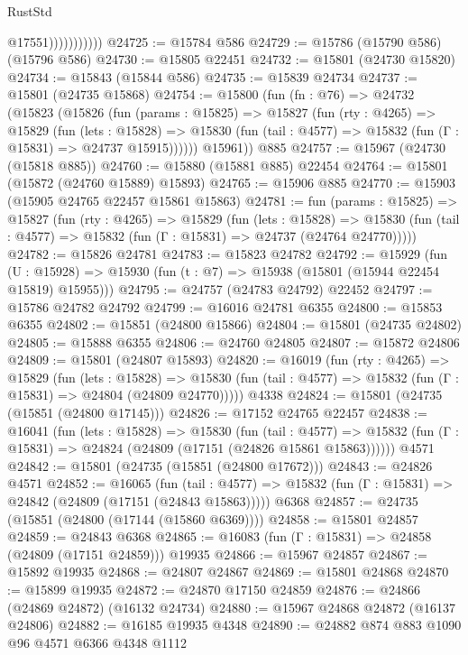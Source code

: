 \begin{lexlean}{RustStd}
\begin{coremodule}
                          @17551)))))))))))
@24725 := @15784 @586
@24729 := @15786 (@15790 @586) (@15796 @586)
@24730 := @15805 @22451
@24732 := @15801 (@24730 @15820)
@24734 := @15843 (@15844 @586)
@24735 := @15839 @24734
@24737 := @15801 (@24735 @15868)
@24754 := @15800
    (fun (fn : @76) =>
    @24732
      (@15823
        (@15826
          (fun (params : @15825) =>
          @15827
            (fun (rty : @4265) =>
            @15829
              (fun (lets : @15828) =>
              @15830 (fun (tail : @4577) => @15832 (fun (Γ : @15831) => @24737 @15915))))))
        @15961))
    @885
@24757 := @15967 (@24730 (@15818 @885))
@24760 := @15880 (@15881 @885) @22454
@24764 := @15801 (@15872 (@24760 @15889) @15893)
@24765 := @15906 @885
@24770 := @15903 (@15905 @24765 @22457 @15861 @15863)
@24781 := fun (params : @15825) =>
  @15827
    (fun (rty : @4265) =>
    @15829
      (fun (lets : @15828) =>
      @15830 (fun (tail : @4577) => @15832 (fun (Γ : @15831) => @24737 (@24764 @24770)))))
@24782 := @15826 @24781
@24783 := @15823 @24782
@24792 := @15929
    (fun (U : @15928) => @15930 (fun (t : @7) => @15938 (@15801 (@15944 @22454 @15819) @15955)))
@24795 := @24757 (@24783 @24792) @22452
@24797 := @15786 @24782 @24792
@24799 := @16016 @24781 @6355
@24800 := @15853 @6355
@24802 := @15851 (@24800 @15866)
@24804 := @15801 (@24735 @24802)
@24805 := @15888 @6355
@24806 := @24760 @24805
@24807 := @15872 @24806
@24809 := @15801 (@24807 @15893)
@24820 := @16019
    (fun (rty : @4265) =>
    @15829
      (fun (lets : @15828) =>
      @15830 (fun (tail : @4577) => @15832 (fun (Γ : @15831) => @24804 (@24809 @24770)))))
    @4338
@24824 := @15801 (@24735 (@15851 (@24800 @17145)))
@24826 := @17152 @24765 @22457
@24838 := @16041
    (fun (lets : @15828) =>
    @15830
      (fun (tail : @4577) =>
      @15832 (fun (Γ : @15831) => @24824 (@24809 (@17151 (@24826 @15861 @15863))))))
    @4571
@24842 := @15801 (@24735 (@15851 (@24800 @17672)))
@24843 := @24826 @4571
@24852 := @16065
    (fun (tail : @4577) => @15832 (fun (Γ : @15831) => @24842 (@24809 (@17151 (@24843 @15863)))))
    @6368
@24857 := @24735 (@15851 (@24800 (@17144 (@15860 @6369))))
@24858 := @15801 @24857
@24859 := @24843 @6368
@24865 := @16083 (fun (Γ : @15831) => @24858 (@24809 (@17151 @24859))) @19935
@24866 := @15967 @24857
@24867 := @15892 @19935
@24868 := @24807 @24867
@24869 := @15801 @24868
@24870 := @15899 @19935
@24872 := @24870 @17150 @24859
@24876 := @24866 (@24869 @24872) (@16132 @24734)
@24880 := @15967 @24868 @24872 (@16137 @24806)
@24882 := @16185 @19935 @4348
@24890 := @24882 @874 @883 @1090 @96 @4571 @6366 @4348 @1112

\end{coremodule}
\end{lexlean}
